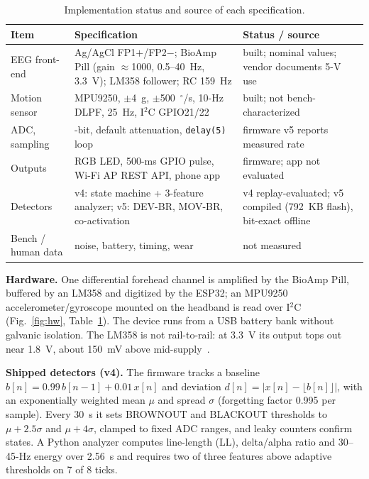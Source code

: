 \documentclass[conference,letterpaper]{IEEEtran}
\begin{document}
\begin{table}[t]
\centering
\caption{Implementation status and source of each specification.}
\label{tab:status}
\footnotesize
\setlength{\tabcolsep}{2pt}
\begin{tabular}{>{\raggedright\arraybackslash}p{}>{\raggedright\arraybackslash}p{}>{\raggedright\arraybackslash}p{}}
\toprule
Item & Specification & Status / source \\
\midrule
EEG front-end & Ag/AgCl FP1$+$/FP2$-$; BioAmp Pill (gain $\approx$1000, 0.5--40~Hz, 3.3~V); LM358 follower; RC 159~Hz & built; nominal values; vendor documents 5-V use~\cite{bioamp} \\
Motion sensor & MPU9250, $\pm$4~g, $\pm$500~$^\circ$/s, 10-Hz DLPF, 25~Hz, I$^2$C GPIO21/22~\cite{mpu9250} & built; not bench-characterized \\
ADC, sampling & 12-bit, default attenuation, \texttt{delay(5)} loop & firmware v5 reports measured rate \\
Outputs & RGB LED, 500-ms GPIO pulse, Wi-Fi AP REST API, phone app & firmware; app not evaluated \\
Detectors & v4: state machine + 3-feature analyzer; v5: DEV-BR, MOV-BR, co-activation & v4 replay-evaluated; v5 compiled (792~KB flash), bit-exact offline \\
Bench / human data & noise, battery, timing, wear & not measured \\
\bottomrule
\end{tabular}
\end{table}

\textbf{Hardware.} One differential forehead channel is amplified by the BioAmp Pill, buffered by an LM358 and digitized by the ESP32; an MPU9250 accelerometer/gyroscope mounted on the headband is read over I$^2$C (Fig.~\ref{fig:hw}, Table~\ref{tab:status}). The device runs from a USB battery bank without galvanic isolation. The LM358 is not rail-to-rail: at 3.3~V its output tops out near 1.8~V, about 150~mV above mid-supply~\cite{lm358}.

\textbf{Shipped detectors (v4).} The firmware tracks a baseline $b[n]{=}0.99\,b[n{-}1]{+}0.01\,x[n]$ and deviation $d[n]{=}|x[n]-\lfloor b[n]\rfloor|$, with an exponentially weighted mean $\mu$ and spread $\sigma$ (forgetting factor 0.995 per sample). Every 30~s it sets BROWNOUT and BLACKOUT thresholds to $\mu{+}2.5\sigma$ and $\mu{+}4\sigma$, clamped to fixed ADC ranges, and leaky counters confirm states. A Python analyzer computes line-length (LL), delta/alpha ratio and 30--45-Hz energy over 2.56~s and requires two of three features above adaptive thresholds on 7 of 8 ticks.
\end{document}
